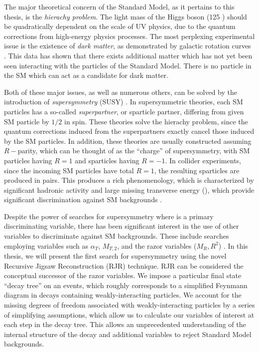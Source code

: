 The major theoretical concern of the Standard Model, as it pertains to this thesis, is the \textit{hierachy problem}\cite {Weinberg:1975gm,Weinberg:1979bn, Gildener:1976ai, Susskind:1978ms, susyPrimer}.
The light mass of the Higgs boson (125 \GeV) should be quadratically dependent on the scale of UV physics, due to the quantum corrections from high-energy physics processes.
The most perplexing experimental issue is the existence of \textit{dark matter}, as demonstrated by galactic rotation curves \cite{Rubin:1970zza, Roberts:1970zza, Rubin:1980zd, Rubin:1985ze, Bosma:1981zz, Persic:1995ru, darkMatterPrimer}.
This data has shown that there exists additional matter which has not yet been seen interacting with the particles of the Standard Model.
There is no particle in the SM which can act as a candidate for dark matter.

Both of these major issues, as well as numerous others, can be solved by the introduction of \textit{supersymmetry} (SUSY) \cite{Miyazawa:1966mfa, Gervais:1971xj, Gervais:1971ji, Golfand:1971iw, Neveu:1971rx, Neveu:1971iv, Volkov:1973ix,  Wess:1973kz, Salam:1974ig, Ferrara:1974ac, Wess:1974tw, susyPrimer,Lykken:1996xt,archilSUSYLectures}.
In supersymmetric theories, each SM particles has a so-called \textit{superpartner}, or sparticle partner, differing from given SM particle by $1/2$ in spin.
These theories solve the hierachy problem, since the quantum corrections induced from the superpartners exactly cancel those induced by the SM particles.
In addition, these theories are usually constructed assuming $R-$parity, which can be thought of as the ``charge'' of supersymmetry, with SM particles having $R=1$ and sparticles having $R=-1$.
In collider experiments, since the incoming SM particles have total $R=1$, the resulting sparticles are produced in pairs.
This produces a rich phenomenology, which is characterized by significant hadronic activity and large missing transverse energy (\met), which provide significant discrimination against SM backgrounds \cite{Farrar:1978xj}.

Despite the power of searches for supersymmetry where \met is a primary discriminating variable, there has been significant interest in the use of other variables to discriminate against SM backgrounds.
These include searches employing variables such as $\alpha_{T}$, $ M_{T,2}$, and the razor variables ($M_R, R^2$) \cite{SUSY-2014-05, SUSY-2014-06, SUSY-2014-07, CMS-SUS-12-005, CMS-SUS-11-024, CMS-SUS-12-005, CMS-SUS-10-003, CMS-SUS-11-003, CMS-SUS-12-002,CMS-SUS-13-019, CMS-SUS-15-003, SUSY-2011-22}.
In this thesis, we will present the first search for supersymmetry using the novel Recursive Jigsaw Reconstruction (RJR) technique.
RJR can be considered the conceptual successor of the razor variables.
We impose a particular final state ``decay tree'' on an events, which roughly corresponds to a simplified Feynmann diagram in decays containing weakly-interacting particles.
We account for the missing degrees of freedom associated with weakly-interacting particles by a series of simplifying assumptions, which allow us to calculate our variables of interest at each step in the decay tree.
This allows an unprecedented understanding of the internal structure of the decay and additional variables to reject Standard Model backgrounds.

